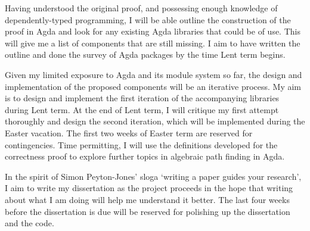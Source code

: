 \documentclass[a4paper]{scrartcl}
\begin{document}
Having understood the original proof, and possessing enough knowledge of dependently-typed programming, I will be able outline the construction of the proof in Agda and look for any existing Agda libraries that could be of use.
This will give me a list of components that are still missing.
I aim to have written the outline and done the survey of Agda packages by the time Lent term begins.

Given my limited exposure to Agda and its module system so far, the design and implementation of the proposed components will be an iterative process.
My aim is to design and implement the first iteration of the accompanying libraries during Lent term.
At the end of Lent term, I will critique my first attempt thoroughly and design the second iteration, which will be implemented during the Easter vacation.
The first two weeks of Easter term are reserved for contingencies.
Time permitting, I will use the definitions developed for the correctness proof to explore further topics in algebraic path finding in Agda.

In the spirit of Simon Peyton-Jones' sloga `writing a paper guides your research', I aim to write my dissertation as the project proceeds in the hope that writing about what I am doing will help me understand it better.
The last four weeks before the dissertation is due will be reserved for polishing up the dissertation and the code.

\printbibliography
\end{document}
